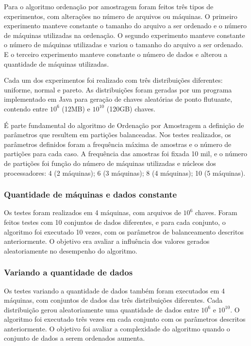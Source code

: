 Para o algoritmo ordenação por amostragem foram feitos três tipos de experimentos, com alterações no número de arquivos ou máquinas. O primeiro experimento manteve constante o tamanho do arquivo a ser ordenado e o número de máquinas utilizadas na ordenação. O segundo experimento manteve constante o número de máquinas utilizadas e variou o tamanho do arquivo a ser ordenado. E o terceiro experimento manteve constante o número de dados e alterou a quantidade de máquinas utilizadas. 

Cada um dos experimentos foi realizado com três distribuições diferentes: uniforme, normal e pareto. As distribuições foram geradas por um programa implementado em Java para geração de chaves aleatórias de ponto flutuante, contendo entre $10^{6}$ (12MB) e  $10^{10}$ (120GB) chaves. 

É parte fundamental do algoritmo de Ordenação por Amostragem a definição de parâmetros que resultem em partições balanceadas. Nos testes realizados, os parâmetros definidos foram a frequência máxima de amostras e o número de partições para cada caso.  A frequência das amostras foi fixada 10 mil, e o número de partições foi função do número de máquinas utilizadas e núcleos dos processadores: 
			4 (2 máquinas); 
			6 (3 máquinas); 
			8 (4 máquinas); 
			10 (5 máquinas).


\subsubsection{Quantidade de máquinas e dados constante} 

Os testes foram realizados em 4 máquinas, com arquivos de $10^{6}$ chaves. Foram feitos testes com 10 conjuntos de dados diferentes, e para cada conjunto, o algoritmo foi executado 10 vezes, com os parâmetros de balanceamento descritos anteriormente.  O objetivo era avaliar a influência dos valores gerados aleatoriamente no desempenho do algoritmo. 

\subsubsection{Variando a quantidade de dados}
 
 Os testes variando a quantidade de dados também foram executados em 4 máquinas, com conjuntos de dados das três distribuições diferentes. Cada distribuição gerou aleatoriamente uma quantidade de dados entre $10^{6}$ e $10^{10}$. O algoritmo foi executado três vezes em cada conjunto com os parâmetros descritos anteriormente. O objetivo foi avaliar a complexidade do algoritmo quando o conjunto de dados a serem ordenados aumenta.
 
